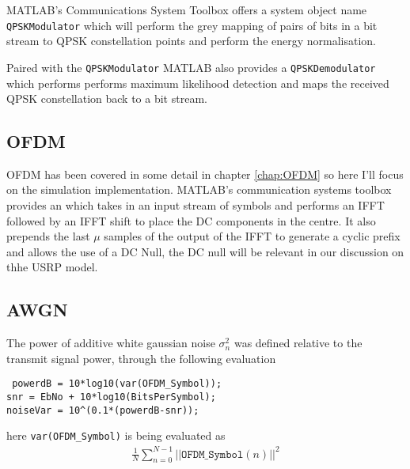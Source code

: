 MATLAB's Communications System Toolbox offers %
a system object name \texttt{QPSKModulator} which %
will perform the grey mapping of pairs of bits in a %
bit stream to QPSK constellation points and perform %
the energy normalisation.

Paired with the \texttt{QPSKModulator} MATLAB also %
provides a \texttt{QPSKDemodulator} which performs %
performs maximum likelihood detection and maps %
the received QPSK constellation back to a bit %
stream.

\subsection{OFDM}

OFDM has been covered in some detail in chapter %
\ref{chap:OFDM} so here I'll focus on the simulation %
implementation. MATLAB's communication systems %
toolbox provides an  which %
takes in an input stream of symbols and performs %
an IFFT followed by an IFFT shift to place the DC %
components in the centre. It also prepends the %
last $\mu$ samples of the output of the IFFT to %
generate a cyclic prefix and allows the use %
of a DC Null, the DC null will be relevant in %
our discussion on thhe USRP model.

\subsection{AWGN}

The power of additive white gaussian noise $\sigma_n^{2}$ %
was defined relative to the transmit signal power, through %
the following evaluation

\texttt{%
powerdB = 10*log10(var(OFDM\_Symbol));\\%
snr = EbNo + 10*log10(BitsPerSymbol);\\%
noiseVar = 10\textasciicircum(0.1*(powerdB-snr));}

here \texttt{var(OFDM\_Symbol)} is being evaluated %
as 
\begin{align}
	\frac{1}{N} %
	\sum_{n=0}^{N-1} \lvert\lvert \texttt{OFDM\_Symbol}%
	(n) \rvert\rvert^{2}
\end{align}

